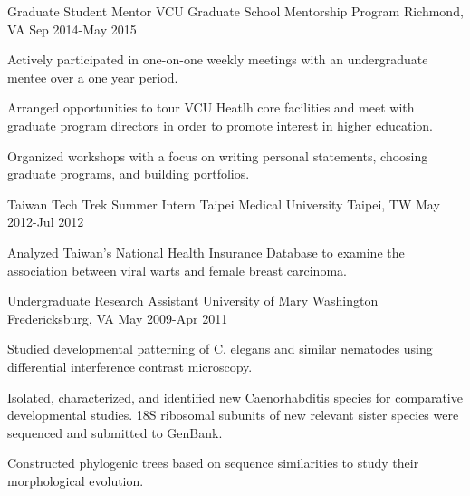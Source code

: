 \begin{cventries}
    \cventry
    {Graduate Student Mentor} %
    {VCU Graduate School Mentorship Program} %
    {Richmond, VA} %
    {Sep 2014-May 2015} %
    {
      \begin{cvitems} %
        \item {Actively participated in one-on-one weekly meetings with an undergraduate mentee over a one year period.}
        \item {Arranged opportunities to tour VCU Heatlh core facilities and meet with graduate program directors in order to promote interest in higher education.}
        \item {Organized workshops with a focus on writing personal statements, choosing graduate programs, and building portfolios.} 
      \end{cvitems}
    }

\cventry
{Taiwan Tech Trek Summer Intern} %
{Taipei Medical University} %
{Taipei, TW} %
{May 2012-Jul 2012} %
{
  \begin{cvitems} %
    \item {Analyzed Taiwan's National Health Insurance Database to examine the association between viral warts and female breast carcinoma.}
  \end{cvitems}
}

\cventry
{Undergraduate Research Assistant} %
{University of Mary Washington} %
{Fredericksburg,  VA} %
{May 2009-Apr 2011} %
{
  \begin{cvitems} %
    \item {Studied developmental patterning of C. elegans and similar nematodes using differential interference contrast microscopy.}
    \item {Isolated, characterized, and identified new Caenorhabditis species for comparative developmental studies. 18S ribosomal subunits of new relevant sister species were sequenced and submitted to GenBank.}
    \item {Constructed phylogenic trees based on sequence similarities to study their morphological evolution.}
  \end{cvitems}
}

\end{cventries}
